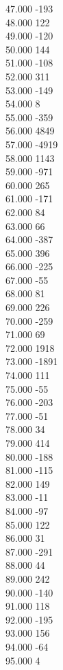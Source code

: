 { 47.000	-193 \\
 48.000	122 \\
 49.000	-120 \\
 50.000	144 \\
 51.000	-108 \\
 52.000	311 \\
 53.000	-149 \\
 54.000	8 \\
 55.000	-359 \\
 56.000	4849 \\
 57.000	-4919 \\
 58.000	1143 \\
 59.000	-971 \\
 60.000	265 \\
 61.000	-171 \\
 62.000	84 \\
 63.000	66 \\
 64.000	-387 \\
 65.000	396 \\
 66.000	-225 \\
 67.000	-55 \\
 68.000	81 \\
 69.000	226 \\
 70.000	-259 \\
 71.000	69 \\
 72.000	1918 \\
 73.000	-1891 \\
 74.000	111 \\
 75.000	-55 \\
 76.000	-203 \\
 77.000	-51 \\
 78.000	34 \\
 79.000	414 \\
 80.000	-188 \\
 81.000	-115 \\
 82.000	149 \\
 83.000	-11 \\
 84.000	-97 \\
 85.000	122 \\
 86.000	31 \\
 87.000	-291 \\
 88.000	44 \\
 89.000	242 \\
 90.000	-140 \\
 91.000	118 \\
 92.000	-195 \\
 93.000	156 \\
 94.000	-64 \\
 95.000	4 \\
}
